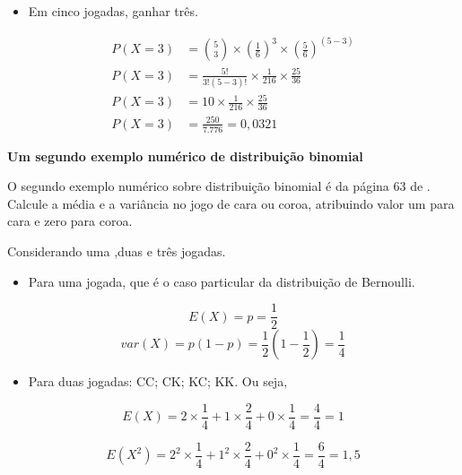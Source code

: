 \documentclass[
]{book}
\providecommand{\tightlist}{%
  \setlength{\itemsep}{0pt}\setlength{\parskip}{0pt}}
\begin{document}
\begin{itemize}
\tightlist
\item
  Em cinco jogadas, ganhar três.
\end{itemize}

\begin{align*}
  P(X=3) &= \binom{5}{3} \times \left(\frac{1}{6}\right)^3\times \left(\frac{5}{6}\right)^{(5-3)}\\
  P(X=3) &= \frac{5!}{3!(5-3)!}\times \frac{1}{216} \times \frac{25}{36}\\
  P(X=3) &= 10 \times \frac{1}{216} \times \frac{25}{36}\\
  P(X=3) &= \frac{250}{7.776} = 0,0321
\end{align*}

\textbf{Um segundo exemplo numérico de distribuição binomial}

O segundo exemplo numérico sobre distribuição binomial é da página 63 de \citet{Sartoris2013}. Calcule a média e a variância no jogo de cara ou coroa, atribuindo valor um para cara e zero para coroa.

Considerando uma ,duas e três jogadas.

\begin{itemize}
\tightlist
\item
  Para uma jogada, que é o caso particular da distribuição de Bernoulli.
\end{itemize}

\begin{equation*}
  E(X) = p = \frac{1}{2}
\end{equation*}
\begin{equation*}
  var(X) = p(1-p) = \frac{1}{2}\left(1  - \frac{1}{2} \right) = \frac{1}{4}
\end{equation*}

\begin{itemize}
\tightlist
\item
  Para duas jogadas: CC; CK; KC; KK. Ou seja,
\end{itemize}

\begin{equation*}
  E(X) = 2 \times \frac{1}{4} + 1 \times \frac{2}{4} + 0 \times \frac{1}{4} = \frac{4}{4} = 1
\end{equation*}

\begin{equation*}
  E(X^2) = 2^2\times \frac{1}{4} + 1^2 \times \frac{2}{4} + 0^2\times \frac{1}{4} = \frac{6}{4} = 1,5
\end{equation*}
\end{document}
